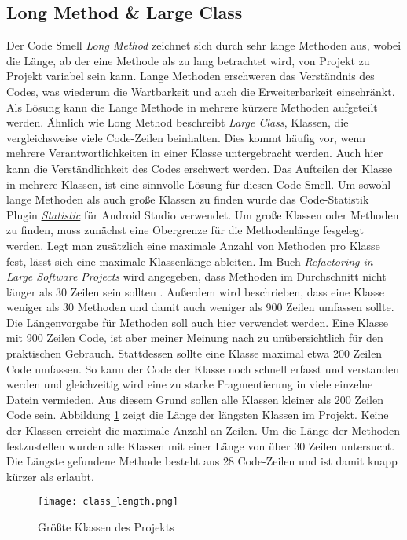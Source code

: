 \subsection{Long Method \& Large Class}

Der Code Smell \textit{Long Method} zeichnet sich durch sehr lange Methoden aus, wobei die Länge, ab der eine Methode als zu lang betrachtet wird, von Projekt zu Projekt variabel sein kann.
Lange Methoden erschweren das Verständnis des Codes, was wiederum die Wartbarkeit und auch die Erweiterbarkeit einschränkt. 
Als Lösung kann die Lange Methode in mehrere kürzere Methoden aufgeteilt werden.
\newline
\newline
Ähnlich wie Long Method beschreibt \textit{Large Class}, Klassen, die vergleichsweise viele Code-Zeilen beinhalten.
Dies kommt häufig vor, wenn mehrere Verantwortlichkeiten in einer Klasse untergebracht werden. Auch hier kann die Verständlichkeit des Codes erschwert werden.
Das Aufteilen der Klasse in mehrere Klassen, ist eine sinnvolle Lösung für diesen Code Smell.
\newline
\newline
Um sowohl lange Methoden als auch große Klassen zu finden wurde das Code-Statistik Plugin \href{https://plugins.jetbrains.com/plugin/4509-statistic}{\textit{Statistic}} für Android Studio verwendet.
Um große Klassen oder Methoden zu finden, muss zunächst eine Obergrenze für die Methodenlänge fesgelegt werden.
Legt man zusätzlich eine maximale Anzahl von Methoden pro Klasse fest, lässt sich eine maximale Klassenlänge ableiten.
Im Buch \textit{Refactoring in Large Software Projects} wird angegeben, dass Methoden im Durchschnitt nicht länger als 30 Zeilen sein sollten \cite[p.~31]{refactoring_lippert}.
Außerdem wird beschrieben, dass eine Klasse weniger als 30 Methoden und damit auch weniger als 900 Zeilen umfassen sollte.
Die Längenvorgabe für Methoden soll auch hier verwendet werden.
Eine Klasse mit 900 Zeilen Code, ist aber meiner Meinung nach zu unübersichtlich für den praktischen Gebrauch.
Stattdessen sollte eine Klasse maximal etwa 200 Zeilen Code umfassen.
So kann der Code der Klasse noch schnell erfasst und verstanden werden und gleichzeitig wird eine zu starke Fragmentierung in viele einzelne Datein vermieden.
Aus diesem Grund sollen alle Klassen kleiner als 200 Zeilen Code sein.
\newline
Abbildung \ref{fig:class_length} zeigt die Länge der längsten Klassen im Projekt.
Keine der Klassen erreicht die maximale Anzahl an Zeilen.
Um die Länge der Methoden festzustellen wurden alle Klassen mit einer Länge von über 30 Zeilen untersucht.
Die Längste gefundene Methode besteht aus 28 Code-Zeilen und ist damit knapp kürzer als erlaubt.
\begin{figure}[h]
  \texttt{[image: class\_length.png]}
  \centering
  \caption{Größte Klassen des Projekts}
  \label{fig:class_length}
\end{figure}

